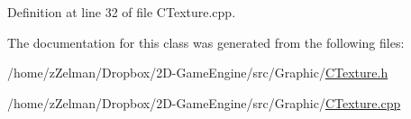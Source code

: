 Definition at line 32 of file C\-Texture.\-cpp.



The documentation for this class was generated from the following files\-:\begin{DoxyCompactItemize}
\item 
/home/z\-Zelman/\-Dropbox/2\-D-\/\-Game\-Engine/src/\-Graphic/\hyperlink{CTexture_8h}{C\-Texture.\-h}\item 
/home/z\-Zelman/\-Dropbox/2\-D-\/\-Game\-Engine/src/\-Graphic/\hyperlink{CTexture_8cpp}{C\-Texture.\-cpp}\end{DoxyCompactItemize}
